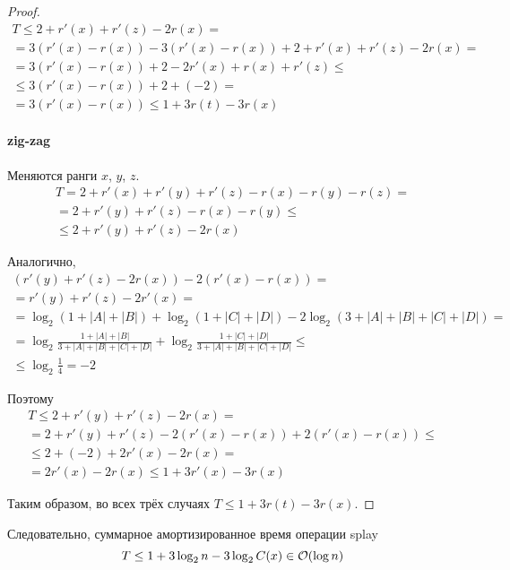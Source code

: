 \begin{proof}
    \begin{gather*}
        T \le 2 + r'(x) + r'(z) - 2r(x) = \\
        = 3 (r'(x) - r(x)) - 3 (r'(x) - r(x)) + 2 + r'(x) + r'(z) - 2r(x) = \\
        = 3 (r'(x) - r(x)) + 2 - 2 r'(x) + r(x) + r'(z) \le \\
        \le 3 (r'(x) - r(x)) + 2 + (-2) = \\
        = 3 (r'(x) - r(x)) \le 1 + 3 r(t) - 3 r(x)
    \end{gather*}

    \paragraph{zig-zag}
    Меняются ранги $x$, $y$, $z$.
    \begin{gather*}
        T = 2 + r'(x) + r'(y) + r'(z) - r(x) - r(y) - r(z) = \\
        = 2 + r'(y) + r'(z) - r(x) - r(y) \le \\
        \le 2 + r'(y) + r'(z) - 2 r(x)
    \end{gather*}

    Аналогично,
    \begin{gather*}
        (r'(y) + r'(z) - 2 r(x)) - 2 (r'(x) - r(x)) = \\
        = r'(y) + r'(z) - 2 r'(x) = \\
        = \log_2 (1 + |A| + |B|) + \log_2 (1 + |C| + |D|)
        - 2 \log_2 (3 + |A| + |B| + |C| + |D|) = \\
        = \log_2 \frac{1 + |A| + |B|}{3 + |A| + |B| + |C| + |D|}
        + \log_2 \frac{1 + |C| + |D|}{3 + |A| + |B| + |C| + |D|} \le \\
        \le \log_2 \frac{1}{4} = -2
    \end{gather*}

    Поэтому
    \begin{gather*}
        T \le 2 + r'(y) + r'(z) - 2 r(x) = \\
        = 2 + r'(y) + r'(z) - 2 (r'(x) - r(x)) + 2 (r'(x) - r(x)) \le \\
        \le 2 + (-2) + 2 r'(x) - 2 r(x) = \\
        = 2 r'(x) - 2 r(x) \le 1 + 3 r'(x) - 3 r(x)
    \end{gather*}

    Таким образом, во всех трёх случаях
    $T \le 1 + 3 r(t) - 3 r(x)$.
\end{proof}

Следовательно, суммарное амортизированное время операции splay
\[ T \le 1 + 3 \log_2 n - 3 \log_2 C(x) \in \mathcal{O}(\log n) \]
